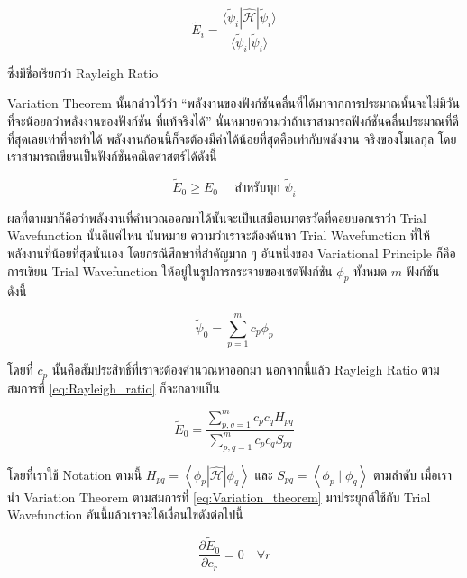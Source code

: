 \begin{equation}
    \label{eq:Rayleigh_ratio}
    \tilde{E}_i 
    = \frac{\langle\tilde{\psi}_i | \hat{\mathscr{H}} | \tilde{\psi}_i\rangle}
        {\langle\tilde{\psi}_i | \tilde{\psi}_i\rangle}
\end{equation}

\noindent ซึ่งมีชื่อเรียกว่า Rayleigh Ratio

Variation Theorem นั้นกล่าวไว้ว่า \enquote{พลังงานของฟังก์ชันคลื่นที่ได้มาจากการประมาณนั้นจะไม่มีวันที่จะน้อยกว่าพลังงานของฟังก์ชัน%
ที่แท้จริงได้} นั่นหมายความว่าถ้าเราสามารถฟังก์ชันคลื่นประมาณที่ดีที่สุดเลยเท่าที่จะทำได้ พลังงานก้อนนี้ก็จะต้องมีค่าได้น้อยที่สุดคือเท่ากับพลังงาน%
จริงของโมเลกุล โดยเราสามารถเขียนเป็นฟังก์ชันคณิตศาสตร์ได้ดังนี้

\begin{equation}
    \label{eq:Variation_theorem}
    \tilde{E}_0 \geq E_0 \quad \text{ สำหรับทุก } \tilde{\psi}_i
\end{equation}

\noindent ผลที่ตามมาก็คือว่าพลังงานที่คำนวณออกมาได้นั้นจะเป็นเสมือนมาตรวัดที่คอยบอกเราว่า Trial Wavefunction นั้นดีแค่ไหน นั่นหมาย%
ความว่าเราจะต้องค้นหา Trial Wavefunction ที่ให้พลังงานที่น้อยที่สุดนั่นเอง โดยกรณีศึกษาที่สำคัญมาก ๆ อันหนึ่งของ Variational Principle 
ก็คือการเขียน Trial Wavefunction ให้อยู่ในรูปการกระจายของเซตฟังก์ชัน $\phi_p$ ทั้งหมด $m$ ฟังก์ชัน ดังนี้

\begin{equation}
    \tilde{\psi}_0 = \sum_{p=1}^m c_p \phi_p
\end{equation}

\noindent โดยที่ $c_p$ นั้นคือสัมประสิทธิ์ที่เราจะต้องคำนวณหาออกมา นอกจากนี้แล้ว Rayleigh Ratio ตามสมการที่ \ref{eq:Rayleigh_ratio}
ก็จะกลายเป็น

\begin{equation}
    \tilde{E}_0 
    = 
    \frac{\sum_{p, q=1}^m c_p c_q H_{p q}}{\sum_{p, q=1}^m c_p c_q S_{p q}}
\end{equation}

\noindent โดยที่เราใช้ Notation ตามนี้ $H_{p q}=\left\langle\phi_p|\hat{\mathscr{H}}| \phi_q\right\rangle$ และ 
$S_{p q}=\left\langle\phi_p \mid \phi_q\right\rangle$ ตามลำดับ เมื่อเรานำ Variation Theorem ตามสมการที่ 
\ref{eq:Variation_theorem} มาประยุกต์ใช้กับ Trial Wavefunction อันนี้แล้วเราจะได้เงื่อนไขดังต่อไปนี้ 

\begin{equation}
    \frac{\partial \tilde{E}_0}{\partial c_r} = 0 \quad \forall r
\end{equation}


